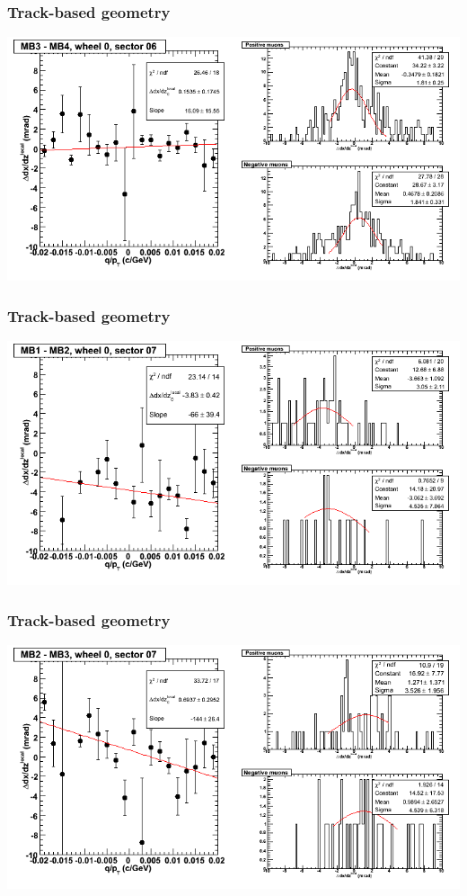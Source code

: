 \documentclass[compress]{beamer}
\begin{document}
\begin{frame}
\frametitle{Track-based geometry}
\includegraphics[width=\linewidth]{NOV4_segdiffs/dt13_slope_C_06_34.png}
\end{frame}

\begin{frame}
\frametitle{Track-based geometry}
\includegraphics[width=\linewidth]{NOV4_segdiffs/dt13_slope_C_07_12.png}
\end{frame}

\begin{frame}
\frametitle{Track-based geometry}
\includegraphics[width=\linewidth]{NOV4_segdiffs/dt13_slope_C_07_23.png}
\end{frame}
\end{document}
